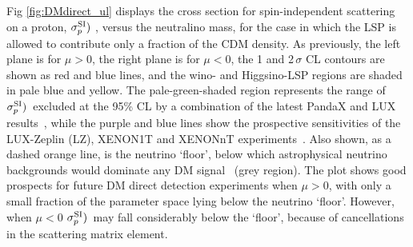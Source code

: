 Fig \ref{fig:DMdirect_ul} displays the cross section for spin-independent scattering on a proton, $\sigma_p^{\rm SI})$ , versus the neutralino mass, for the case in which the LSP is allowed to contribute only a fraction of the CDM density. As previously, the left plane is for $\mu > 0$, the right plane is for $\mu < 0$, the 1 and 2\,$\sigma$ CL contours are shown as red and blue lines,
and the wino- and Higgsino-LSP regions are shaded in pale blue and yellow. The pale-green-shaded  region represents the range of $\sigma_p^{\rm SI})$\ excluded at the 95\% CL by {a} combination of the latest PandaX and LUX results~\cite{pandax,lux16}, while the purple and {blue} line{s} show the prospective sensitivities of the LUX-Zeplin (LZ), XENON1T {and XENONnT} experiment{s}~\cite{LZ,XENON1T}. Also shown, as a dashed orange line, is the neutrino `floor', below which astrophysical neutrino 
backgrounds would dominate any DM signal~\cite{Snowmass} {(grey region)}. The plot shows good prospects for future DM direct detection experiments when $\mu > 0$, with only a small fraction of the parameter space lying below the neutrino `floor'. {However, when $\mu < 0$ $\sigma_p^{\rm SI})$\ may fall considerably below the `floor', because of cancellations~\cite{cancellations} in the scattering matrix element.}

